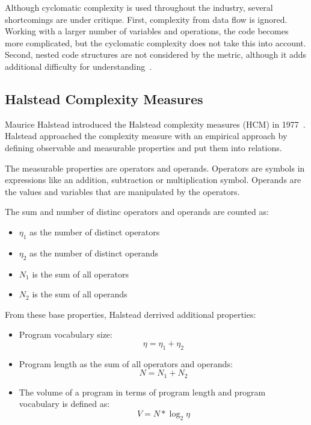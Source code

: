 Although cyclomatic complexity is used throughout the industry, several shortcomings are under critique. First, complexity from data flow is ignored. Working with a larger number of variables and operations, the code becomes more complicated, but the cyclomatic complexity does not take this into account. Second, nested code structures are not considered by the metric, although it adds additional difficulty for understanding~\cite{yu_survey_2010}.

\subsection{Halstead Complexity Measures}
Maurice Halstead introduced the Halstead complexity measures (HCM) in 1977~\cite{halstead1977elements}. Halstead approached the complexity measure with an empirical approach by defining observable and measurable properties and put them into relations.

The measurable properties are operators and operands. Operators are symbols in expressions like an addition, subtraction or multiplication symbol. Operands are the values and variables that are manipulated by the operators. 

The sum and number of distinc operators and operands are counted as:
\begin{itemize}
    \item $\eta_1$ as the number of distinct operators 
    \item $\eta_2$ as the number of distinct operands
    \item $N_1$ is the sum of all operators
    \item $N_2$ is the sum of all operands  
\end{itemize}

From these base properties, Halstead derrived additional properties:
\begin{itemize}
    \item Program vocabulary size:
    \begin{displaymath}
        \eta = \eta_1 + \eta_2
    \end{displaymath}
    \item Program length as the sum of all operators and operands:
    \begin{displaymath}
        N = N_1 + N_2
    \end{displaymath}
    \item The volume of a program in terms of program length and program vocabulary is defined as: 
    \begin{displaymath}
        V = N * \log_2{\eta}
    \end{displaymath}
\end{itemize}

